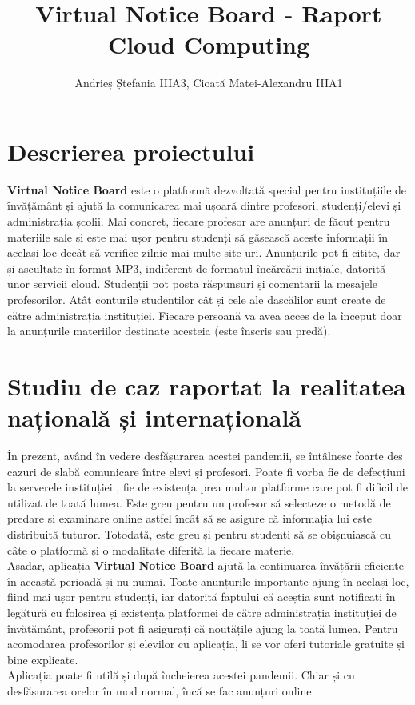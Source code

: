 \documentclass[12pt]{article}
\newcommand\tab[1][1cm]{\hspace*{#1}}
\begin{document}
\title{
  Virtual Notice Board - Raport \\
  \large Cloud Computing}
\author{Andrieș Ștefania IIIA3, Cioată Matei-Alexandru IIIA1}
\maketitle
\thispagestyle{titlepagestyle}

\section{Descrierea proiectului}
\tab \textbf{Virtual Notice Board} este o platformă dezvoltată special pentru instituțiile de învățământ și ajută la comunicarea mai ușoară dintre profesori, studenți/elevi și administrația școlii. Mai concret, fiecare profesor are anunțuri de făcut pentru materiile sale și este mai ușor pentru studenți să găsească aceste informații în același loc decât să verifice zilnic mai multe site-uri. Anunțurile pot fi citite, dar și ascultate în format MP3, indiferent de formatul încărcării inițiale, datorită unor servicii cloud. Studenții pot posta răspunsuri și comentarii la mesajele profesorilor. Atât conturile studentilor cât și cele ale dascălilor sunt create de către administrația instituției. Fiecare persoană va avea acces de la început doar la anunțurile materiilor destinate acesteia (este înscris sau predă).

\section{Studiu de caz raportat la realitatea națională și internațională}
\tab În prezent, având în vedere desfășurarea acestei pandemii, se întâlnesc foarte des cazuri de slabă comunicare între elevi și profesori. Poate fi vorba fie de defecțiuni la serverele instituției , fie de existența prea multor platforme care pot fi dificil de utilizat de toată lumea. Este greu pentru un profesor să selecteze o metodă de predare și examinare online astfel încât să se asigure că informația lui este distribuită tuturor. Totodată, este greu și pentru studenți să se obișnuiască cu câte o platformă și o modalitate diferită la fiecare materie. \\
\tab Așadar, aplicația \textbf{Virtual Notice Board} ajută la continuarea învățării eficiente în această perioadă și nu numai. Toate anunțurile importante ajung în același loc, fiind mai ușor pentru studenți, iar datorită faptului că aceștia sunt notificați în legătură cu folosirea și existența platformei de către administrația instituției de învătământ, profesorii pot fi asigurați că noutățile ajung la toată lumea. Pentru acomodarea profesorilor și elevilor cu aplicația, li se vor oferi tutoriale gratuite și bine explicate.\\
\tab Aplicația poate fi utilă și după încheierea acestei pandemii. Chiar și cu desfășurarea orelor în mod normal, încă se fac anunțuri online.
\end{document}
